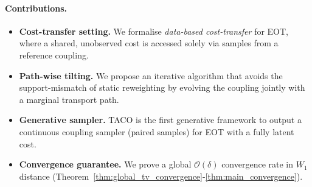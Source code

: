 \documentclass[11pt]{article}
\theoremstyle{definition}
\numberwithin{equation}{section}%
\begin{document}
\paragraph{Contributions.}
\begin{itemize}[leftmargin=1.3em,itemsep=0pt,topsep=2pt]
  \item \textbf{Cost-transfer setting.} We formalise \textit{data-based cost-transfer} for EOT, where a shared, unobserved cost is accessed solely via samples from a reference coupling.
  \item \textbf{Path-wise tilting.} We propose an iterative algorithm that avoids the support-mismatch of static reweighting by evolving the coupling jointly with a marginal transport path.
  \item \textbf{Generative sampler.} TACO is the first generative framework to output a continuous coupling sampler (paired samples) for EOT with a fully latent cost.
  \item \textbf{Convergence guarantee.} We prove a global $\mathcal{O}(\delta)$ convergence rate in $W_1$ distance (Theorem~\ref{thm:global_tv_convergence}-\ref{thm:main_convergence}).
\end{itemize}



\end{document}
